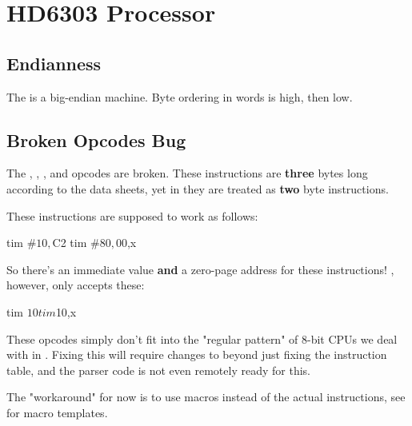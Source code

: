 \chapter{HD6303 Processor}
\label{processor:6303}

\section{Endianness}

The  is a big-endian machine. Byte ordering in words is high, then low.

\section{Broken Opcodes Bug}
\label{changelog:20200903bug}
The , , , and  opcodes are broken. These instructions are \textbf{three} bytes long according to the data sheets, yet in \dasm they are
treated as \textbf{two} byte instructions.

These instructions are supposed
to work as follows:

\begin{code}
	tim	#$10,$C2
	tim	#$80,$00,x
\end{code}

So there's an immediate value \textbf{and} a zero-page address
for these instructions! \dasm, however, only accepts these:

\begin{code}
	tim	$10
	tim	$10,x
\end{code}

These opcodes simply don't fit into the "regular pattern" of 8-bit CPUs
we deal with in \dasm. Fixing this will require changes to
\dasm beyond just fixing the instruction table, and the parser code is not even remotely ready for this.

The "workaround" for now is to use macros instead of the
actual instructions, see  for macro templates.

